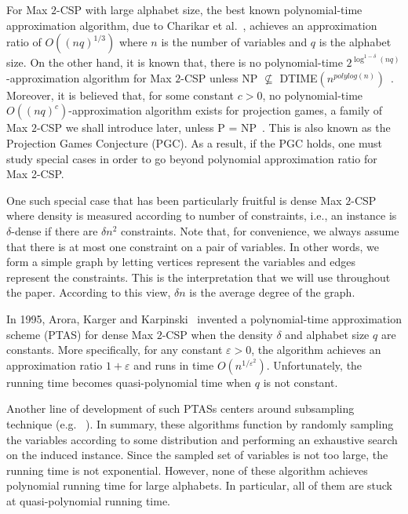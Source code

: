 \documentclass{article}
\begin{document}
For Max $2$-CSP with large alphabet size, the best known polynomial-time approximation algorithm, due to Charikar et al.~\cite{CHK}, achieves an approximation ratio of $O((nq)^{1/3})$ where $n$ is the number of variables and $q$ is the alphabet size. On the other hand, it is known that, there is no polynomial-time $2^{\log^{1-\delta} (nq)}$-approximation algorithm for {\sc Max $2$-CSP} unless NP $\not\subseteq$ DTIME$(n^{polylog(n)})$~\cite{Raz}. Moreover, it is believed that, for some constant $c > 0$, no polynomial-time $O((nq)^c)$-approximation algorithm exists for projection games, a family of {\sc Max $2$-CSP} we shall introduce later, unless P = NP~\cite{M}. This is also known as the Projection Games Conjecture (PGC). As a result, if the PGC holds, one must study special cases in order to go beyond polynomial approximation ratio for {\sc Max 2-CSP}.

One such special case that has been particularly fruitful is dense {\sc Max $2$-CSP} where density is measured according to number of constraints, i.e., an instance is $\delta$-dense if there are $\delta n^2$ constraints. Note that, for convenience, we always assume that there is at most one constraint on a pair of variables. In other words, we form a simple graph by letting vertices represent the variables and edges represent the constraints. This is the interpretation that we will use throughout the paper. According to this view, $\delta n$ is the average degree of the graph.

In 1995, Arora, Karger and Karpinski~\cite{AKK95} invented a polynomial-time approximation scheme (PTAS) for dense Max $2$-CSP when the density $\delta$ and alphabet size $q$ are constants. More specifically, for any constant $\varepsilon > 0$, the algorithm achieves an approximation ratio $1 + \varepsilon$ and runs in time $O(n^{1/\varepsilon^2})$. Unfortunately, the running time becomes quasi-polynomial time when $q$ is not constant.

Another line of development of such PTASs centers around subsampling technique (e.g. ~\cite{AIM, Alon:2003:RSA:963875.963877, BMHS11}). In summary, these algorithms function by randomly sampling the variables according to some distribution and performing an exhaustive search on the induced instance. Since the sampled set of variables is not too large, the running time is not exponential. However, none of these algorithm achieves polynomial running time for large alphabets. In particular, all of them are stuck at quasi-polynomial running time.
\end{document}
